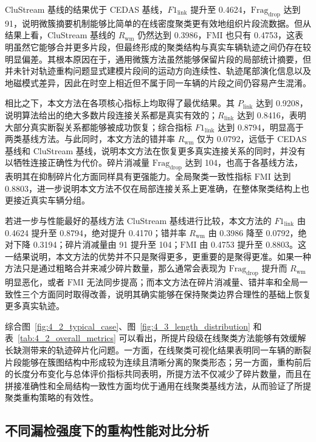 \documentclass{xdupgthesis}
\begin{document}
CluStream 基线的结果优于 CEDAS 基线，$F1_{\mathrm{link}}$ 提升至 0.4624，$\mathrm{Frag}_{\mathrm{drop}}$ 达到 91，说明微簇摘要机制能够比简单的在线密度聚类更有效地组织片段流数据。但从结果上看，CluStream 基线的 $R_{\mathrm{wm}}$ 仍然达到 0.3986，$\mathrm{FMI}$ 也只有 0.4753，这表明虽然它能够合并更多片段，但最终形成的聚类结构与真实车辆轨迹之间仍存在较明显偏差。其根本原因在于，通用微簇方法虽然能够保留片段的局部统计摘要，但并未针对轨迹重构问题显式建模片段间的运动方向连续性、轨迹尾部演化信息以及地磁模式差异，因此在时空上相近但不属于同一车辆的片段之间仍容易产生混淆。

相比之下，本文方法在各项核心指标上均取得了最优结果。其 $P_{\mathrm{link}}$ 达到 0.9208，说明算法给出的绝大多数片段连接关系都是真实有效的；$R_{\mathrm{link}}$ 达到 0.8416，表明大部分真实断裂关系都能够被成功恢复；综合指标 $F1_{\mathrm{link}}$ 达到 0.8794，明显高于两类基线方法。与此同时，本文方法的错并率 $R_{\mathrm{wm}}$ 仅为 0.0792，远低于 CEDAS 基线和 CluStream 基线，说明本文方法在恢复更多真实连接关系的同时，并没有以牺牲连接正确性为代价。碎片消减量 $\mathrm{Frag}_{\mathrm{drop}}$ 达到 104，也高于各基线方法，表明其在抑制碎片化方面同样具有更强能力。全局聚类一致性指标 $\mathrm{FMI}$ 达到 0.8803，进一步说明本文方法不仅在局部连接关系上更准确，在整体聚类结构上也更接近真实车辆分组。

若进一步与性能最好的基线方法 CluStream 基线进行比较，本文方法的 $F1_{\mathrm{link}}$ 由 0.4624 提升至 0.8794，绝对提升 0.4170；错并率 $R_{\mathrm{wm}}$ 由 0.3986 降至 0.0792，绝对下降 0.3194；碎片消减量由 91 提升至 104；$\mathrm{FMI}$ 由 0.4753 提升至 0.8803。这一结果说明，本文方法的优势并不只是聚得更多，更重要的是聚得更准。如果一种方法只是通过粗略合并来减少碎片数量，那么通常会表现为 $\mathrm{Frag}_{\mathrm{drop}}$ 提升而 $R_{\mathrm{wm}}$ 明显恶化，或者 $\mathrm{FMI}$ 无法同步提高；而本文方法在碎片消减量、错并率和全局一致性三个方面同时取得改善，说明其确实能够在保持聚类边界合理性的基础上恢复更多真实轨迹。

综合图~\ref{fig:4_2_typical_case}、图~\ref{fig:4_3_length_distribution} 和表~\ref{tab:4_2_overall_metrics} 可以看出，所提片段级在线聚类方法能够有效缓解长缺测带来的轨迹碎片化问题。一方面，在线聚类可视化结果表明同一车辆的断裂片段能够在簇图结构中形成较为连续且清晰分离的聚类形态；另一方面，重构前后的长度分布变化与总体评价指标共同表明，所提方法不仅减少了碎片数量，而且在拼接准确性和全局结构一致性方面均优于通用在线聚类基线方法，从而验证了所提聚类重构策略的有效性。





\subsection{不同漏检强度下的重构性能对比分析}
\end{document}
